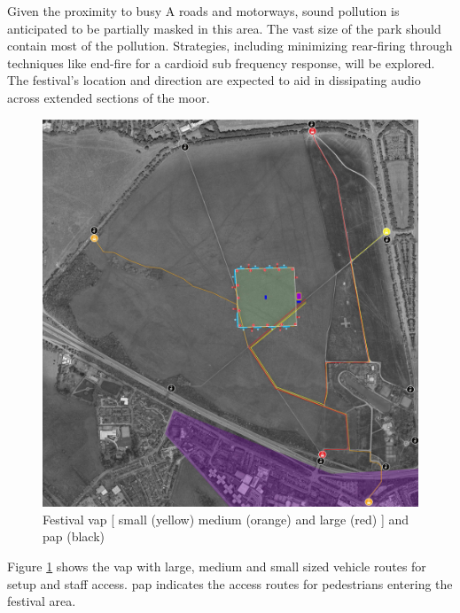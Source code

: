         Given the proximity to busy A roads and motorways, sound pollution is anticipated to be partially masked in this area. The vast size of the park should contain most of the pollution. Strategies, including minimizing rear-firing through techniques like end-fire for a cardioid sub frequency response, will be explored. The festival's location and direction are expected to aid in dissipating audio across extended sections of the moor.
        
        \begin{figure}[H]
            \centering
            \includegraphics[width=\textwidth]{Images/festival_vap_pap.jpg}
            \caption{Festival \acrshort{vap} [ small (yellow) medium (orange) and large (red) ] and \acrshort{pap} (black)}
            \label{fig:festival_vap_pap}
        \end{figure}

        Figure \ref{fig:festival_vap_pap} shows the \acrfull{vap} with large, medium and small sized vehicle routes for setup and staff access. \acrfull{pap} indicates the access routes for pedestrians entering the festival area.

